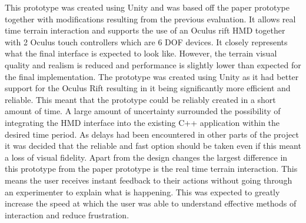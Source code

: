 \documentclass{article}
\begin{document}
This prototype was created using Unity and was based off the paper prototype together with modifications resulting from the previous evaluation. It allows real time terrain interaction and supports the use of an Oculus rift HMD together with 2 Oculus touch controllers which are 6 DOF devices. It closely represents what the final interface is expected to look like. However, the terrain visual quality and realism is reduced and performance is slightly lower than expected for the final implementation.
\newline\newline
The prototype was created using Unity as it had better support for the Oculus Rift resulting in it being significantly more efficient and reliable. This meant that the prototype could be reliably created in a short amount of time. A large amount of uncertainty surrounded the possibility of integrating the HMD interface into the existing C++ application within the desired time period. As delays had been encountered in other parts of the project it was decided that the reliable and fast option should be taken even if this meant a loss of visual fidelity.
\newline\newline
Apart from the design changes the largest difference in this prototype from the paper prototype is the real time terrain interaction. This means the user receives instant feedback to their actions without going through an experimenter to explain what is happening. This was expected to greatly increase the speed at which the user was able to understand effective methods of interaction and reduce frustration.
\end{document}
